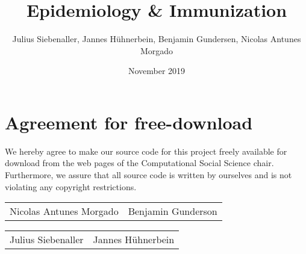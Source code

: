 \documentclass[11pt]{article}
\title{Epidemiology \& Immunization}
\author{Julius Siebenaller, Jannes Hühnerbein, Benjamin Gundersen, Nicolas Antunes Morgado}
\date{November 2019}
\begin{document}


\newpage

\newpage
\section*{Agreement for free-download}
\bigskip
\bigskip

\large We hereby agree to make our source code for this project freely available for download from the web pages of the Computational Social Science chair. Furthermore, we assure that all source code is written by ourselves and is not violating any copyright restrictions.

\begin{center}
\bigskip
\bigskip
\bigskip
\bigskip

\begin{tabular}{@{}p{8cm}@{}@{}p{8cm}@{}}

\begin{minipage}{8cm}
\large Nicolas Antunes Morgado
\end{minipage}

&
\begin{minipage}{8cm}
\large Benjamin Gunderson
\end{minipage}

\end{tabular}


\vspace{3\baselineskip}

\begin{tabular}{@{}p{8cm}@{}@{}p{8cm}@{}}

\begin{minipage}{8cm}
\large Julius Siebenaller
\end{minipage}
&
\begin{minipage}{8cm}
\large Jannes Hühnerbein
\end{minipage}
\end{tabular}

\end{center}


\newpage




\end{document}
